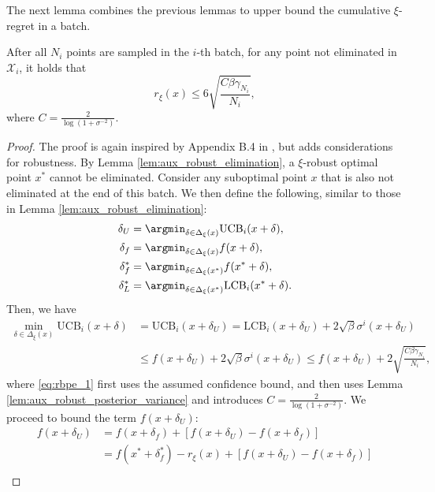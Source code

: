 \documentclass[10pt]{article}
\begin{document}
The next lemma combines the previous lemmas to upper bound the cumulative $\xi$-regret in a batch.
\begin{lemma}
    \label{lem:aux_xi_regret}
    After all $N_i$ points are sampled in the $i$-th batch,
    for any point not eliminated in $\mathcal{X}_i$, it holds that
    \begin{equation}
        r_{\xi}(x) \leq 6\sqrt{\frac{C\beta\gamma_{N_i}}{N_i}},
    \end{equation}
    where $C=\frac{2}{\log(1+\sigma^{-2})}$.
\end{lemma}
\begin{proof}
    The proof is again inspired by Appendix B.4 in \citep{Cai21b}, but adds considerations for robustness. By Lemma \ref{lem:aux_robust_elimination}, a $\xi$-robust optimal point $x^*$ cannot be eliminated. Consider any suboptimal point $x$ that is also not eliminated at the end of this batch.
    We then define the following, similar to those in Lemma \ref{lem:aux_robust_elimination}:
    \begin{align}
        \delta_U & = \argmin_{\delta\in\Delta_{\xi}(x)} \mathrm{UCB}_i(x+\delta), \\
        \delta_f & = \argmin_{\delta\in\Delta_{\xi}(x)} f(x+\delta), \\
        \delta^*_f & = \argmin_{\delta\in\Delta_{\xi}(x^*)} f(x^*+\delta), \\
        \delta^*_L & = \argmin_{\delta\in\Delta_{\xi}(x^*)} \mathrm{LCB}_i(x^*+\delta).
    \end{align}
    Then, we have
    \begin{align}
        \min_{\delta\in\Delta_{\xi}(x)} \mathrm{UCB}_i(x+\delta)
        & = \mathrm{UCB}_i(x+\delta_U)
        = \mathrm{LCB}_i(x+\delta_U) + 2\sqrt{\beta}\sigma^i(x+\delta_U) \\
        & \leq f(x+\delta_U) + 2\sqrt{\beta}\sigma^i(x+\delta_U)
        \leq f(x+\delta_U) + 2\sqrt{\frac{C\beta\gamma_{N_i}}{N_i}}, \label{eq:rbpe_1}
    \end{align}
    where \eqref{eq:rbpe_1} first uses the assumed confidence bound, and then uses Lemma \ref{lem:aux_robust_posterior_variance} and introduces $C = \frac{2}{\log(1+\sigma^{-2})} $.
    We  proceed to bound the term $f(x+\delta_U)$:
    \begin{align}
        f(x+\delta_U)
        & = f(x+\delta_f) + [f(x+\delta_U) - f(x+\delta_f)] \\
        & = f(x^*+\delta^*_f) - r_{\xi}(x) + [f(x+\delta_U) - f(x+\delta_f)] \label{eq:rbpe_use_def} \\

\end{align}
\end{proof}
\end{document}

